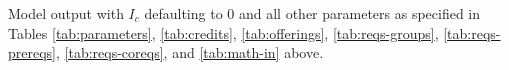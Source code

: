 \documentclass[12pt]{article}
\begin{document}
\begin{table}[H]
    \centering
    
    \caption{Model output with $I_c$ defaulting to 0 and all other parameters as specified in Tables \ref{tab:parameters}, \ref{tab:credits}, \ref{tab:offerings}, \ref{tab:reqs-groups}, \ref{tab:reqs-prereqs}, \ref{tab:reqs-coreqs}, and \ref{tab:math-in} above.}
    \label{tab:interest-0-out}
\end{table}
\end{document}
